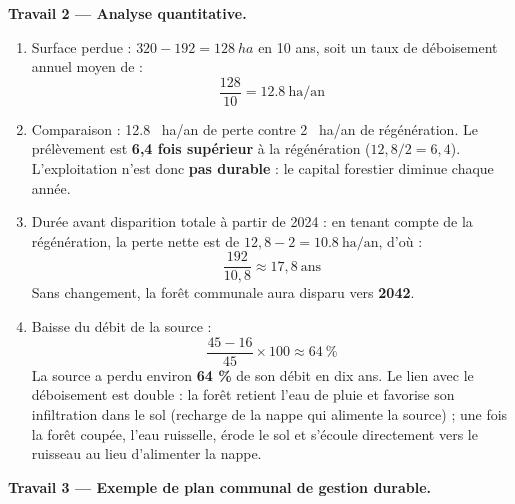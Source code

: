\documentclass[11pt]{article}
\begin{document}
\begin{exoresolu}
\textbf{Travail 2 — Analyse quantitative.}
\begin{enumerate}
\item Surface perdue : $320 - 192 = \SI{128}{ha}$ en 10 ans, soit un taux de déboisement annuel moyen de :
\[ \frac{128}{10} = \num{12,8} \ \text{ha/an} \]
\item Comparaison : \num{12,8} \SI{}{ha/an} de perte contre \num{2} \SI{}{ha/an} de régénération. Le prélèvement est \textbf{6,4 fois supérieur} à la régénération ($12,8 / 2 = 6,4$). L'exploitation n'est donc \textbf{pas durable} : le capital forestier diminue chaque année.
\item Durée avant disparition totale à partir de 2024 : en tenant compte de la régénération, la perte nette est de $12,8 - 2 = \num{10,8} \ \text{ha/an}$, d'où :
\[ \frac{192}{10,8} \approx 17,8 \ \text{ans} \]
Sans changement, la forêt communale aura disparu vers \textbf{2042}.
\item Baisse du débit de la source :
\[ \frac{45 - 16}{45} \times 100 \approx 64\ \% \]
La source a perdu environ \textbf{64 \%} de son débit en dix ans. Le lien avec le déboisement est double : la forêt retient l'eau de pluie et favorise son infiltration dans le sol (recharge de la nappe qui alimente la source) ; une fois la forêt coupée, l'eau ruisselle, érode le sol et s'écoule directement vers le ruisseau au lieu d'alimenter la nappe.
\end{enumerate}

\textbf{Travail 3 — Exemple de plan communal de gestion durable.}


\end{exoresolu}
\end{document}

